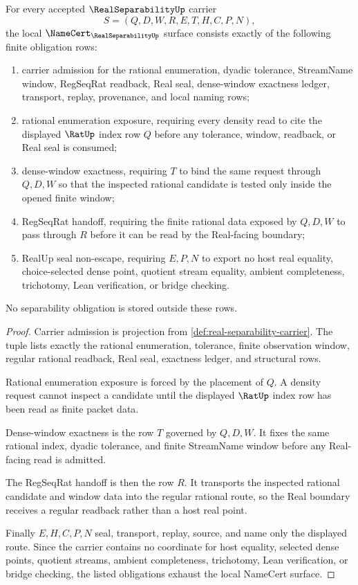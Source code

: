 \begin{theorem}
\label{thm:real-separability-namecert-obligations}
For every accepted $\RealSeparabilityUp$ carrier
$$
S=(Q,D,W,R,E,T,H,C,P,N),
$$
the local $\NameCert_{\RealSeparabilityUp}$ surface consists exactly of the following finite obligation rows:
\begin{enumerate}
\item carrier admission for the rational enumeration, dyadic tolerance, StreamName window, RegSeqRat readback, Real seal, dense-window exactness ledger, transport, replay, provenance, and local naming rows;
\item rational enumeration exposure, requiring every density read to cite the displayed $\RatUp$ index row $Q$ before any tolerance, window, readback, or Real seal is consumed;
\item dense-window exactness, requiring $T$ to bind the same request through $Q,D,W$ so that the inspected rational candidate is tested only inside the opened finite window;
\item RegSeqRat handoff, requiring the finite rational data exposed by $Q,D,W$ to pass through $R$ before it can be read by the Real-facing boundary;
\item RealUp seal non-escape, requiring $E,P,N$ to export no host real equality, choice-selected dense point, quotient stream equality, ambient completeness, trichotomy, Lean verification, or bridge checking.
\end{enumerate}
No separability obligation is stored outside these rows.
\end{theorem}
\begin{proof}
Carrier admission is projection from \autoref{def:real-separability-carrier}. The tuple lists exactly the rational enumeration, tolerance, finite observation window, regular rational readback, Real seal, exactness ledger, and structural rows.

Rational enumeration exposure is forced by the placement of $Q$. A density request cannot inspect a candidate until the displayed $\RatUp$ index row has been read as finite packet data.

Dense-window exactness is the row $T$ governed by $Q,D,W$. It fixes the same rational index, dyadic tolerance, and finite StreamName window before any Real-facing read is admitted.

The RegSeqRat handoff is then the row $R$. It transports the inspected rational candidate and window data into the regular rational route, so the Real boundary receives a regular readback rather than a host real point.

Finally $E,H,C,P,N$ seal, transport, replay, source, and name only the displayed route. Since the carrier contains no coordinate for host equality, selected dense points, quotient streams, ambient completeness, trichotomy, Lean verification, or bridge checking, the listed obligations exhaust the local NameCert surface.
\end{proof}

